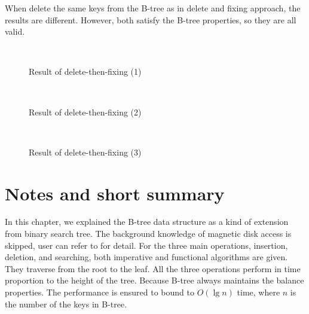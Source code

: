 \documentclass[b5paper]{article}
\begin{document}
When delete the same keys from the B-tree as in delete and fixing
approach, the results are different. However, both satisfy
the B-tree properties, so they are all valid.

\begin{figure}[htbp]
  \centering
  \\
  \caption{Result of delete-then-fixing (1)} \label{fig:result-del-fp1}
\end{figure}

\begin{figure}[htbp]
  \centering
   \\
  \caption{Result of delete-then-fixing (2)} \label{fig:result-del-fp2}
\end{figure}

\begin{figure}[htbp]
  \centering
   \\
  \caption{Result of delete-then-fixing (3)} \label{fig:result-del-fp3}
\end{figure}



\section{Notes and short summary}
In this chapter, we explained the B-tree data structure as a kind of
extension from binary search tree. The background knowledge of
magnetic disk access is skipped, user can refer to \cite{CLRS}
for detail. For the three main operations, insertion, deletion,
and searching, both imperative and functional algorithms are
given. They traverse from the root to the leaf. All the three
operations perform in time proportion to the height of the tree.
Because B-tree always maintains the balance properties. The
performance is ensured to bound to $O(\lg n)$ time,
where $n$ is the number of the keys in B-tree.
\end{document}
